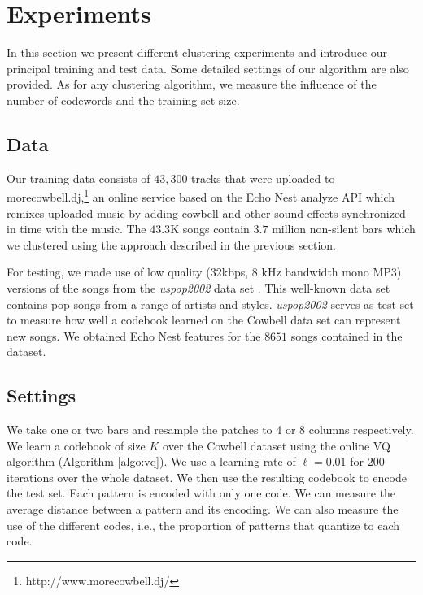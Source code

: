 \documentclass{article}
\newcommand{\ie}{i.e.~}
\begin{document}
\section{Experiments}\label{sec:experiments}
In this section we present different clustering experiments and introduce
our principal training and test data. Some detailed settings
of our algorithm are also provided. As for any clustering algorithm, we
measure the influence of the number of codewords and the training set size.


\subsection{Data}
\label{sec:traindata}
\label{sec:testdata}
Our training data consists of $43,300$ tracks that were uploaded to
morecowbell.dj,\footnote{http://www.morecowbell.dj/} an online service
based on the Echo Nest analyze API which remixes uploaded music by
adding cowbell and other sound effects synchronized in time with the
music.  The $43.3$K songs contain $3.7$ million non-silent
bars which we clustered using the approach described in the previous
section.

For testing, we made use of low quality (32kbps, 8 kHz bandwidth mono MP3) versions of the songs
from the {\it uspop2002} data set \cite{uspop2002}.  This well-known data set 
contains pop songs from a range of artists and styles.
{\it uspop2002} serves as test set to measure how well a codebook learned on
the Cowbell data set can represent new songs.  We obtained Echo Nest features
for the $8651$ songs contained in the dataset.


\subsection{Settings}\label{ssec:setting}
We take one or two bars and resample the patches to 4 or 8 columns 
respectively.  We learn a codebook of size $K$ over the Cowbell
dataset using the online VQ algorithm (Algorithm \ref{algo:vq}). We use a
learning rate of $\ell=0.01$ for $200$ iterations over the whole
dataset.
%
We then use the resulting codebook to encode the test set.
Each pattern is encoded with only one code. We can measure the average
distance between a pattern and its encoding. We can also measure the use
of the different codes, 
i.e., the proportion of patterns that quantize to each code.
\end{document}
